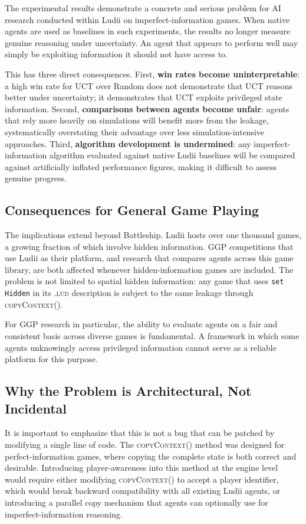 The experimental results demonstrate a concrete and serious problem for AI research conducted within Ludii on imperfect-information games. When native agents are used as baselines in such experiments, the results no longer measure genuine reasoning under uncertainty. An agent that appears to perform well may simply be exploiting information it should not have access to.

This has three direct consequences. First, \textbf{win rates become uninterpretable}: a high win rate for UCT over Random does not demonstrate that UCT reasons better under uncertainty; it demonstrates that UCT exploits privileged state information. Second, \textbf{comparisons between agents become unfair}: agents that rely more heavily on simulations will benefit more from the leakage, systematically overstating their advantage over less simulation-intensive approaches. Third, \textbf{algorithm development is undermined}: any imperfect-information algorithm evaluated against native Ludii baselines will be compared against artificially inflated performance figures, making it difficult to assess genuine progress.

\subsection{Consequences for General Game Playing}

The implications extend beyond Battleship. Ludii hosts over one thousand games, a growing fraction of which involve hidden information. GGP competitions that use Ludii as their platform, and research that compares agents across this game library, are both affected whenever hidden-information games are included. The problem is not limited to spatial hidden information: any game that uses \texttt{set Hidden} in its \textsc{.lud} description is subject to the same leakage through \textsc{copyContext()}.

For GGP research in particular, the ability to evaluate agents on a fair and consistent basis across diverse games is fundamental. A framework in which some agents unknowingly access privileged information cannot serve as a reliable platform for this purpose.

\subsection{Why the Problem is Architectural, Not Incidental}

It is important to emphasize that this is not a bug that can be patched by modifying a single line of code. The \textsc{copyContext()} method was designed for perfect-information games, where copying the complete state is both correct and desirable. Introducing player-awareness into this method at the engine level would require either modifying \textsc{copyContext()} to accept a player identifier, which would break backward compatibility with all existing Ludii agents, or introducing a parallel copy mechanism that agents can optionally use for imperfect-information reasoning.

